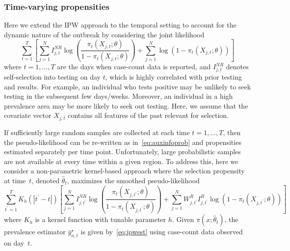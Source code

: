 \documentclass[11pt]{amsart}
\numberwithin{equation}{section}
\theoremstyle{plain}
\begin{document}
 \subsubsection{Time-varying propensities}

 Here we extend the IPW approach to the temporal setting to account for the dynamic nature of the outbreak by considering the joint likelihood
 \begin{equation}
 \label{eq:tvpropensity}
 \sum_{t=1}^T \left[ \sum_{j=1}^N I^{NR}_{j,t} \log \left( \frac{\pi_t (X_{j,t}; \theta)}{1-\pi_t(X_{j,t}; \theta)} \right) + \sum_{j=1}^N \log \left( 1 - \pi_t (X_{j,t}; \theta) \right) \right]
 \end{equation}
 where $t=1,\ldots,T$ are the days when case-count data is reported, and $I^{NR}_{j,t}$ denotes self-selection into testing on day $t$, which is highly correlated with prior testing and results.  For example, an individual who tests positive may be unlikely to seek testing in the subsequent few days/weeks.  Moreover, an individual in a high prevalence area may be more likely to seek out testing.  Here, we assume that the covariate vector $X_{j,t}$ contains all features of the past relevant for selection.

 If sufficiently large random samples are collected at each time $t =1,\ldots,T$, then the pseudo-likelihood can be re-written as in~\eqref{eq:auxinfoprob} and propensities estimated separately per time point.  Unfortunately, large probabilistic samples are not available at every time within a given region.  To address this, here we consider a non-parametric kernel-based approach where the selection propensity at time~$t$, denoted $\hat \theta_t$, maximizes the smoothed pseudo-likelihood
 $$
 \sum_{t^\prime=1}^T K_h(|t^\prime - t|) \left[ \sum_{j=1}^N I_{j,t^\prime}^{NR} \log \left( \frac{\pi_t (X_{j,t^\prime}; \theta)}{1-\pi_t(X_{j,t^\prime}; \theta)} \right) + \sum_{j=1}^N W^{R}_{j,t^\prime} I^R_{j,t^\prime} \log \left( 1 - \pi_t (X_{j,t^\prime}; \theta) \right) \right]
 $$
 where $K_h$ is a kernel function with tunable parameter $h$. Given $\pi (x;\hat \theta_t)$, the prevalence estimator $\bar y_{n,t}^\star$ is given by~\ref{eq:ipwest} using case-count data observed on day~$t$.

\end{document}
